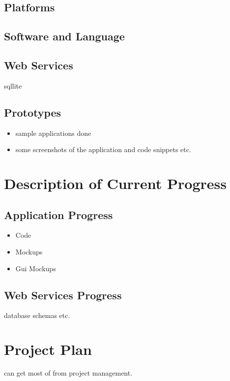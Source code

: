 \documentclass{article}
\begin{document}
\subsection{Platforms}


\subsection{Software and Language}


\subsection{Web Services}
sqllite


\subsection{Prototypes}
\begin{itemize}
\item sample applications done
\item some screenshots of the application and code snippets etc.
\end{itemize}
\newpage


\label{sec:Objectives}
\section{Description of Current Progress}


\subsection{Application Progress}
\begin{itemize}
\item Code
\item Mockups 
\item Gui Mockups
\end{itemize}


\subsection{Web Services Progress}
database schemas etc.
\newpage

\label{sec:Objectives}


\section{Project Plan}
can get most of from project management.
\end{document}

